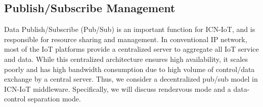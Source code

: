 

\subsection{Publish/Subscribe Management}
Data Publish/Subscribe (Pub/Sub) is an important function for ICN-IoT, and is responsible for resource sharing and management. In conventional IP network, most of the IoT platforms provide a centralized server to aggregate all IoT service and data. While
this centralized architecture ensures high availability, it scales poorly and has high bandwidth consumption due to high volume of control/data exchange by a central server. Thus, we consider a decentralized pub/sub model in ICN-IoT middleware. Specifically, we will discuss rendezvous mode and a data-control separation mode.

